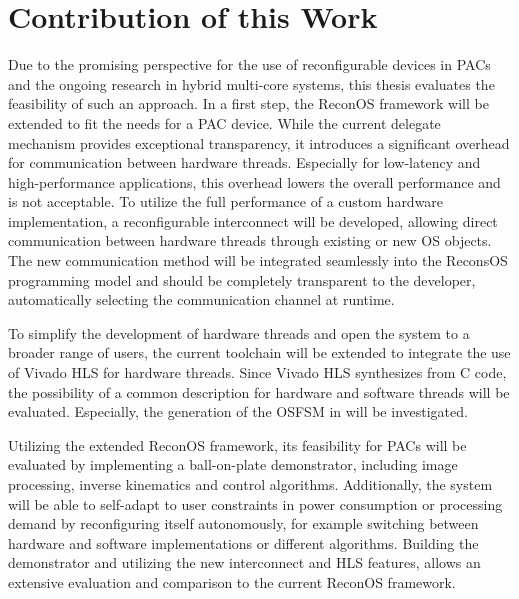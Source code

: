 \section{Contribution of this Work}
Due to the promising perspective for the use of reconfigurable devices in
\acp{PAC} and the ongoing research in hybrid multi-core systems, this thesis
evaluates the feasibility of such an approach. In a first step, the ReconOS
framework will be extended to fit the needs for a \ac{PAC} device. While the
current delegate mechanism provides exceptional transparency, it introduces a
significant overhead for communication between hardware threads. Especially
for low-latency and high-performance applications, this overhead lowers the
overall performance and is not acceptable. To utilize the full performance of
a custom hardware implementation, a reconfigurable interconnect will be
developed, allowing direct communication between hardware threads through
existing or new \ac{OS} objects. The new communication method will be
integrated seamlessly into the ReconsOS programming model and should be
completely transparent to the developer, automatically selecting the
communication channel at runtime.

To simplify the development of hardware threads and open the system to a
broader range of users, the current toolchain will be extended to integrate
the use of Vivado HLS for hardware threads. Since Vivado HLS synthesizes from
C code, the possibility of a common description for hardware and software
threads will be evaluated. Especially, the generation of the \ac{OSFSM} in
will be investigated.

Utilizing the extended ReconOS framework, its feasibility for \acp{PAC} will
be evaluated by implementing a ball-on-plate demonstrator, including image
processing, inverse kinematics and control algorithms. Additionally, the
system will be able to self-adapt to user constraints in power consumption or
processing demand by reconfiguring itself autonomously, for example switching
between hardware and software implementations or different algorithms.
Building the demonstrator and utilizing the new interconnect and \ac{HLS}
features, allows an extensive evaluation and comparison to the current ReconOS
framework.